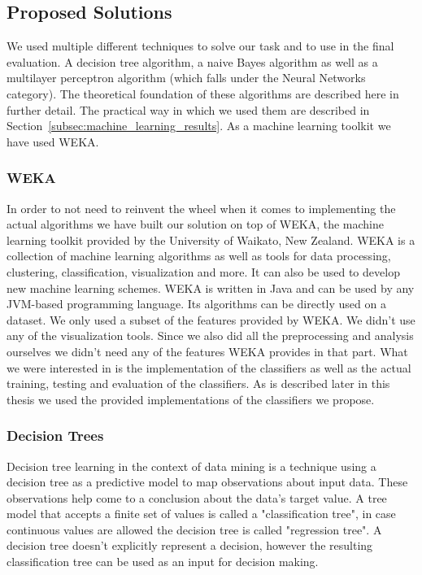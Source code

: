 \subsection{Proposed Solutions}
\label{subsec:proposed_solution}
We used multiple different techniques to solve our task and to use in the final evaluation. A decision tree algorithm, a naive Bayes algorithm as well as a multilayer perceptron algorithm (which falls under the Neural Networks category). The theoretical foundation of these algorithms are described here in further detail. The practical way in which we used them are described in Section~\ref{subsec:machine_learning_results}. As a machine learning toolkit we have used WEKA.

\subsubsection{WEKA}
\label{subsection:WEKA}
In order to not need to reinvent the wheel when it comes to implementing the actual algorithms we have built our solution on top of WEKA, the machine learning toolkit provided by the University of Waikato, New Zealand. WEKA is a collection of machine learning algorithms as well as tools for data processing, clustering, classification, visualization and more. It can also be used to develop new machine learning schemes. WEKA is written in Java and can be used by any JVM-based programming language. Its algorithms can be directly used on a dataset. We only used a subset of the features provided by WEKA. We didn't use any of the visualization tools. Since we also did all the preprocessing and analysis ourselves we didn't need any of the features WEKA provides in that part. What we were interested in is the implementation of the classifiers as well as the actual training, testing and evaluation of the classifiers. As is described later in this thesis we used the provided implementations of the classifiers we propose. 

\subsubsection{Decision Trees}
Decision tree learning in the context of data mining is a technique using a decision tree as a predictive model to map observations about input data. These observations help come to a conclusion about the data's target value. A tree model that accepts a finite set of values is called a "classification tree", in case continuous values are allowed the decision tree is called "regression tree". A decision tree doesn't explicitly represent a decision, however the resulting classification tree can be used as an input for decision making. 

